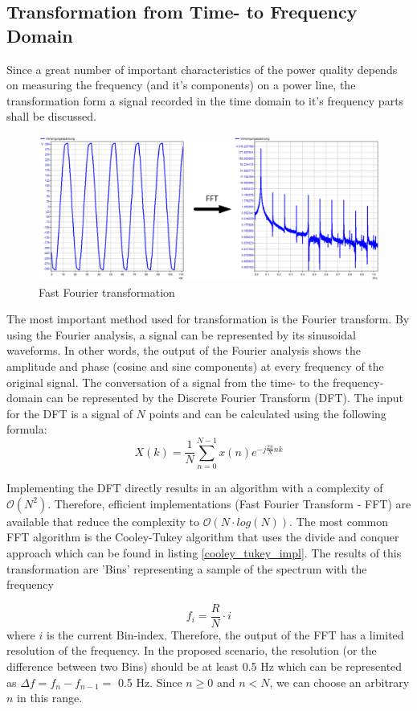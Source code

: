 \subsection{Transformation from Time- to Frequency Domain}
\label{fft}
Since a great number of important characteristics of the power quality depends on measuring the frequency (and it's components) on a power line, the transformation form a signal recorded in the time domain to it's frequency parts shall be discussed.

\begin{figure}[h]
	\centering
		\includegraphics[scale=0.6]{graphics/fft.eps}
	\caption{Fast Fourier transformation}
	\label{fig:fft}
\end{figure}

The most important method used for transformation is the Fourier transform. By using the Fourier analysis, a signal can be represented by its sinusoidal waveforms. In other words, the output of the Fourier analysis shows the amplitude and phase (cosine and sine components) at every frequency of the original signal. The conversation of a signal from the time- to the frequency-domain can be represented by the Discrete Fourier Transform (DFT). The input for the DFT is a signal of $N$ points and can be calculated using the following formula\cite{fourier}:
\[ X(k) = \frac{1}{N} \sum_{n=0}^{N-1} x(n) e^{-j \frac{2 \pi}{N} nk} \]


Implementing the DFT directly results in an algorithm with a complexity of $\mathcal O(N^2)$. Therefore, efficient implementations (Fast Fourier Transform - FFT) are available that reduce the complexity to $\mathcal O(N \cdot log(N))$. The most common FFT algorithm is the Cooley-Tukey algorithm that uses the divide and conquer approach which can be found in listing \ref{cooley_tukey_impl}\cite{cooley_tukey}. The results of this transformation are 'Bins' representing a sample of the spectrum with the frequency

\[f_i = \frac{R}{N} \cdot i \]
where $i$ is the current Bin-index. Therefore, the output of the FFT has a limited resolution of the frequency. In the proposed scenario, the resolution (or the difference between two Bins) should be at least 0.5 Hz which can be represented as $\Delta f = f_{n} - f_{n-1} = $ 0.5 Hz. Since $n \geq 0 $ and $n < N$, we can choose an arbitrary $n$ in this range.

